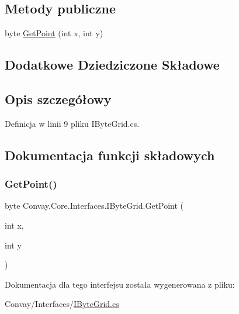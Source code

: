 \subsection*{Metody publiczne}
\begin{DoxyCompactItemize}
\item 
byte \hyperlink{interface_convay_1_1_core_1_1_interfaces_1_1_i_byte_grid_aecc410108b7a1d46531b458bd0837217}{Get\+Point} (int x, int y)
\end{DoxyCompactItemize}
\subsection*{Dodatkowe Dziedziczone Składowe}


\subsection{Opis szczegółowy}


Definicja w linii 9 pliku I\+Byte\+Grid.\+cs.



\subsection{Dokumentacja funkcji składowych}
\hypertarget{interface_convay_1_1_core_1_1_interfaces_1_1_i_byte_grid_aecc410108b7a1d46531b458bd0837217}{}\label{interface_convay_1_1_core_1_1_interfaces_1_1_i_byte_grid_aecc410108b7a1d46531b458bd0837217} 
\subsubsection{\texorpdfstring{Get\+Point()}{GetPoint()}}
{\footnotesize\ttfamily byte Convay.\+Core.\+Interfaces.\+I\+Byte\+Grid.\+Get\+Point (\begin{DoxyParamCaption}\item[{int}]{x,  }\item[{int}]{y }\end{DoxyParamCaption})}



Dokumentacja dla tego interfejsu została wygenerowana z pliku\+:\begin{DoxyCompactItemize}
\item 
Convay/\+Interfaces/\hyperlink{_i_byte_grid_8cs}{I\+Byte\+Grid.\+cs}\end{DoxyCompactItemize}

